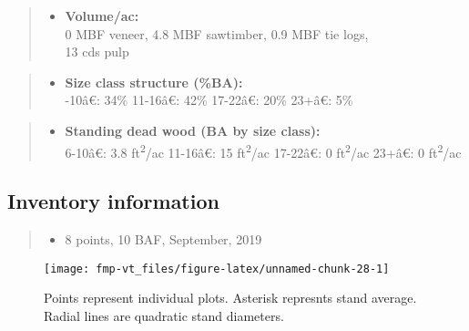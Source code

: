 \documentclass[]{tufte-handout}
\newcommand{\euro}{€}
\providecommand{\tightlist}{%
  \setlength{\itemsep}{0pt}\setlength{\parskip}{0pt}}
\begin{document}
\begin{quote}
\begin{itemize}
\tightlist
\item
  \textbf{Volume/ac:}\\
  \vspace{2pt} 0 MBF veneer, 4.8 MBF sawtimber, 0.9 MBF tie logs,\\
  13 cds pulp
\end{itemize}
\end{quote}

\begin{quote}
\begin{itemize}
\tightlist
\item
  \textbf{Size class structure (\%BA):}\\
  \vspace{2pt} -10â\euro{}: 34\% \textbar{} 11-16â\euro{}:
  42\% \textbar{} 17-22â\euro{}: 20\% \textbar{} 23+â\euro{}: 5\%
\end{itemize}
\end{quote}

\begin{quote}
\begin{itemize}
\tightlist
\item
  \textbf{Standing dead wood (BA by size class):}\\
  \vspace{2pt} 6-10â\euro{}: 3.8 ft\textsuperscript{2}/ac \textbar{}
  11-16â\euro{}: 15 ft\textsuperscript{2}/ac \textbar{} 17-22â\euro{}:
  0 ft\textsuperscript{2}/ac \textbar{} 23+â\euro{}: 0
  ft\textsuperscript{2}/ac
\end{itemize}
\end{quote}

\subsection{Inventory information}\label{inventory-information-6}

\begin{quote}
\begin{itemize}
\tightlist
\item
  8 points, 10 BAF, September, 2019
\end{itemize}
\end{quote}

\begin{figure}
\texttt{[image: fmp-vt\_files/figure-latex/unnamed-chunk-28-1]} \caption[Points represent individual plots]{Points represent individual plots. Asterisk represnts stand average. Radial lines are quadratic stand diameters.}\label{fig:unnamed-chunk-28}
\end{figure}
\end{document}
